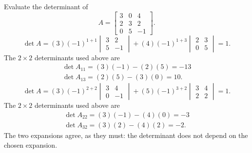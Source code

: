\goal Evaluate the determinant of
\[A=\begin{bmatrix}3&0&4\\2&3&2\\0&5&-1\end{bmatrix}.\]
\[
\det A=(3)(-1)^{1+1}\begin{vmatrix}3&2\\5&-1\end{vmatrix} + (4)(-1)^{1+3}\begin{vmatrix}2&3\\0&5\end{vmatrix}=1.
\]
The $2\times2$ determinants used above are
\[
\begin{gathered}\det A_{11}=(3)(-1)-(2)(5)=-13\\\det A_{13}=(2)(5)-(3)(0)=10.\end{gathered}
\]
\[
\det A=(3)(-1)^{2+2}\begin{vmatrix}3&4\\0&-1\end{vmatrix} + (5)(-1)^{3+2}\begin{vmatrix}3&4\\2&2\end{vmatrix}=1.
\]
The $2\times2$ determinants used above are
\[
\begin{gathered}\det A_{22}=(3)(-1)-(4)(0)=-3\\\det A_{32}=(3)(2)-(4)(2)=-2.\end{gathered}
\]
The two expansions agree, as they must: the determinant does not depend on the chosen expansion.

